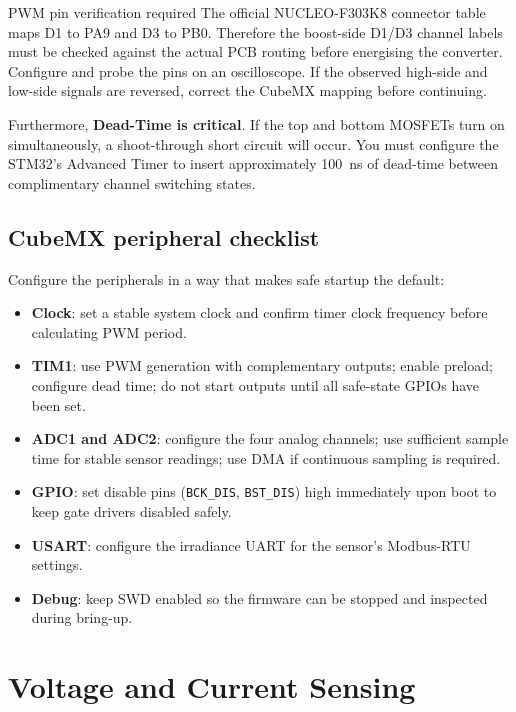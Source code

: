 \documentclass[11pt,a4paper]{article}
\newcommand{\code}[1]{\texttt{#1}}
\let\originalsection\section
\renewcommand{\section}{\clearpage\originalsection}
\begin{document}
\begin{warnbox}{PWM pin verification required}
The official NUCLEO-F303K8 connector table maps D1 to PA9 and D3 to PB0. Therefore the boost-side D1/D3 channel labels must be checked against the actual PCB routing before energising the converter. Configure and probe the pins on an oscilloscope. If the observed high-side and low-side signals are reversed, correct the CubeMX mapping before continuing.

Furthermore, \textbf{Dead-Time is critical}. If the top and bottom MOSFETs turn on simultaneously, a shoot-through short circuit will occur. You must configure the STM32's Advanced Timer to insert approximately 100~ns of dead-time between complimentary channel switching states.
\end{warnbox}

\subsection{CubeMX peripheral checklist}

Configure the peripherals in a way that makes safe startup the default:
\begin{itemize}
  \item \textbf{Clock}: set a stable system clock and confirm timer clock frequency before calculating PWM period.
  \item \textbf{TIM1}: use PWM generation with complementary outputs; enable preload; configure dead time; do not start outputs until all safe-state GPIOs have been set.
  \item \textbf{ADC1 and ADC2}: configure the four analog channels; use sufficient sample time for stable sensor readings; use DMA if continuous sampling is required.
  \item \textbf{GPIO}: set disable pins (\code{BCK\_DIS}, \code{BST\_DIS}) high immediately upon boot to keep gate drivers disabled safely.
  \item \textbf{USART}: configure the irradiance UART for the sensor's Modbus-RTU settings.
  \item \textbf{Debug}: keep SWD enabled so the firmware can be stopped and inspected during bring-up.
\end{itemize}


\section{Voltage and Current Sensing}
\label{sec:sensing}
\end{document}

